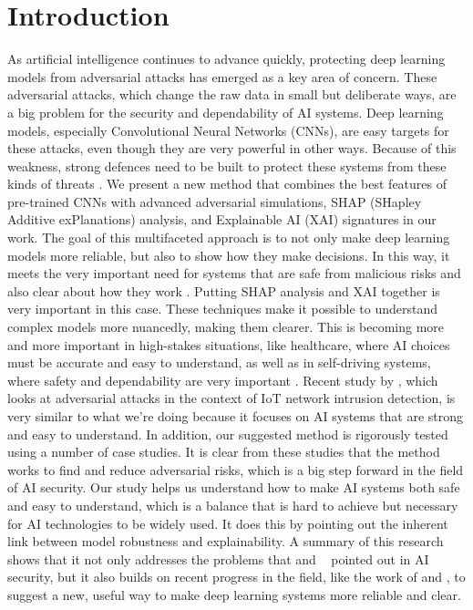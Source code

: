 \documentclass[10pt, conference, a4paper, final]{IEEEtran}
\begin{document}
\section{Introduction}
As artificial intelligence continues to advance quickly, protecting deep learning models
from adversarial attacks has emerged as a key area of concern. These adversarial attacks, 
which change the raw data in small but deliberate ways, are a big problem for the security 
and dependability of AI systems. Deep learning models, especially Convolutional Neural 
Networks (CNNs), are easy targets for these attacks, even though they are very powerful 
in other ways. Because of this weakness, strong defences need to be built to protect these 
systems from these kinds of threats \cite {Akhtar}.
We present a new method that combines the best features of pre-trained CNNs with advanced 
adversarial simulations, SHAP (SHapley Additive exPlanations) analysis, and Explainable AI (XAI) 
signatures in our work. The goal of this multifaceted approach is to not only make deep learning 
models more reliable, but also to show how they make decisions. In this way, it meets the very 
important need for systems that are safe from malicious risks and also clear about how they work \cite {Lee, Morris, Croce}.
Putting SHAP analysis and XAI together is very important in this case. These techniques make it possible 
to understand complex models more nuancedly, making them clearer. This is becoming more and more important 
in high-stakes situations, like healthcare, where AI choices must be accurate and easy to understand, as well
 as in self-driving systems, where safety and dependability are very important \cite {Zhou}. 
Recent study by \cite {Zhou}, which looks at adversarial attacks in the context of IoT network intrusion
 detection, is very similar to what we're doing because it focuses on AI systems that are strong and easy to understand.
In addition, our suggested method is rigorously tested using a number of case studies. It is clear from these 
studies that the method works to find and reduce adversarial risks, which is a big step forward in the field of AI security. 
Our study helps us understand how to make AI systems both safe and easy to understand, which is a balance that is hard to achieve 
but necessary for AI technologies to be widely used. It does this by pointing out the inherent link between model robustness and explainability.
A summary of this research shows that it not only addresses the problems that \cite {Akhtar} and \cite {Dong} 
pointed out in AI security, but it also builds on recent progress in the field, like the work of \cite {Morris} and 
\cite {Croce} , to suggest a new, useful way to make deep learning systems more reliable and clear.
\end{document}
